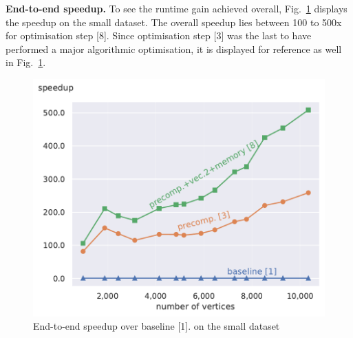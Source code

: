 \documentclass[letterpaper]{article}
\newcommand{\mypar}[1]{{\bf #1.}}
\begin{document}
\mypar{End-to-end speedup} To see the runtime gain achieved overall, Fig.~\ref{speedupEndToEndSmall} displays the speedup on the small dataset.
The overall speedup lies between 100 to 500x for optimisation step [8].
Since optimisation step [3] was the last to have performed a major algorithmic optimisation, it is displayed for reference as well in Fig.~\ref{speedupEndToEndSmall}.
\begin{figure}\centering
	\includegraphics[scale=0.56]{img/speedup[1][3][8]_small.pdf}
	\caption{End-to-end speedup over baseline [1]. on the small dataset} \label{speedupEndToEndSmall}
\end{figure}



\end{document}
